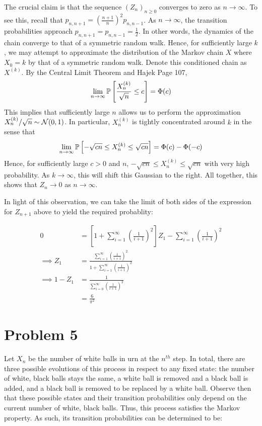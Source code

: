 \documentclass[12pt]{article}%
\begin{document}
The crucial claim is that the sequence $(Z_{n})_{n \geq 0}$ converges to zero as $n \rightarrow \infty$. To see this, recall that $p_{n,n+1} = \left(\frac{n+1}{n}\right)^{2}p_{n,n-1}$. As $n \rightarrow \infty$, the transition probabilities approach $p_{n,n+1} = p_{n,n-1} = \frac{1}{2}$. In other words, the dynamics of the chain converge to that of a symmetric random walk. Hence, for sufficiently large $k$, we may attempt to approximate the distribution of the Markov chain $X$ where $X_{0} = k$ by that of a symmetric random walk. Denote this conditioned chain as $X^{(k)}$. By the Central Limit Theorem and Hajek Page 107, \[\lim_{n \rightarrow \infty}\mathbb{P}\left[\frac{X_{n}^{(k)}}{\sqrt{n}} \leq c\right] = \Phi(c) \] This implies that sufficiently large $n$ allows us to perform the approximation $X^{(k)}_{n}/\sqrt{n} \sim \mathcal{N}(0,1)$. In particular, $X^{(k)}_{n}$ is tightly concentrated around $k$ in the sense that \[ \lim_{n \rightarrow \infty} \mathbb{P}\left[-\sqrt{cn} \leq X^{(k)}_{n} \leq \sqrt{cn}\right] = \Phi(c) - \Phi(-c)\]
%
Hence, for sufficiently large $c > 0$ and $n$, $-\sqrt{cn} \leq X_{n}^{(k)} \leq \sqrt{cn}$ with very high probability. As $k \rightarrow \infty$, this will shift this Gaussian to the right. All together, this shows that $Z_{n} \rightarrow 0$ as $n \rightarrow \infty$.

In light of this observation, we can take the limit of both sides of the expression for $Z_{n+1}$ above to yield the required probablity:

\begin{align*}
  0 & = \left[1 +  \sum_{i = 1}^\infty \left(\frac{1}{i+1}\right)^{2}\right]Z_{1} -  \sum_{i = 1}^\infty \left(\frac{1}{i+1}\right)^{2} \\
  \implies Z_{1} & = \frac{\sum_{i=1}^{\infty}\left(\frac{1}{i+1}\right)^{2}}{1 + \sum_{i=1}^{\infty}\left(\frac{1}{i+1}\right)^{2}} \\
  \implies 1 - Z_{1} & = \frac{1}{\sum_{i=0}^{\infty}\left(\frac{1}{i+1}\right)^{2}} \\
 & = \boxed{\frac{6}{\pi^{2}}}
\end{align*}

\section{Problem 5}
\label{sec:problem-5}

Let $X_{n}$ be the number of white balls in urn at the $n^{{th}}$ step. In total, there are three possible evolutions of this process in respect to any fixed state: the number of white, black balls stays the same, a white ball is removed and a black ball is added, and a black ball is removed to be replaced by a white ball. Observe then that these possible states and their transition probabilities only depend on the current number of white, black balls. Thus, this process satisfies the Markov property. As such, its transition probabilities can be determined to be:
\end{document}
